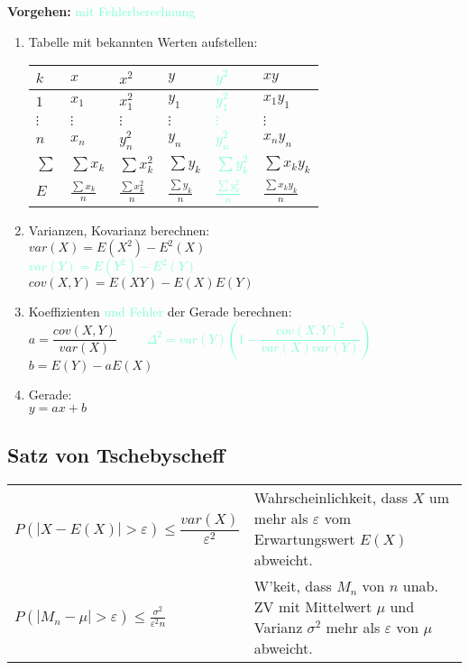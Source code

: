 \begin{minipage}[c]{10cm}
  \textbf{Vorgehen:}
  \textcolor{Aquamarine}{mit Fehlerberechnung}
	\begin{enumerate}
		\item Tabelle mit bekannten Werten aufstellen:\\
  		\begin{tabular}{|l||l|l||l|l||l|}
  		  \hline
        \textbf{$k$} & \textbf{$x$} & \textbf{$x^2$} & \textbf{$y$} &
  		  \textcolor{Aquamarine}{\textbf{$y^2$}} & \textbf{$xy$} \\
  		  \hline \hline
  		  $1$ & $x_1$ & $x_1^2$ & $y_1$ & \textcolor{Aquamarine}{$y_1^2$} & $x_1y_1$ \\
  		  \hline
  		  $\vdots$ & $\vdots$ & $\vdots$ & $\vdots$ & \textcolor{Aquamarine}{$\vdots$} &
  		  $\vdots$ \\\hline $n$ & $x_n$ & $y_n^2$ & $y_n$ & \textcolor{Aquamarine}{$y_n^2$} & $x_ny_n$ \\
  		  \hline
  		  \hline
  		  $\sum$ & $\sum x_k$ & $\sum x_k^2$ & $\sum y_k$ & \textcolor{Aquamarine}{$\sum
  		  y_k^2$} & $\sum x_ky_k$ \\
  		  \hline $E$ & $\frac{\sum x_k}{n}$ & $\frac{\sum x_k^2}{n}$ & $\frac{\sum
  		  y_k}{n}$ & \textcolor{Aquamarine}{$\frac{\sum y_k^2}{n}$} & $\frac{\sum x_ky_k}{n}$ \\
  		  \hline
  		\end{tabular} 
		\item Varianzen, Kovarianz berechnen: \\
		  $var(X) = E(X^2) - E^2(X)$ \\
		  \textcolor{Aquamarine}{$var(Y) = E(Y^2) - E^2(Y)$} \\
		  $cov(X,Y) = E(XY) - E(X)E(Y)$
		\item Koeffizienten \textcolor{Aquamarine}{und Fehler} der Gerade berechnen: \\
		  $a=\dfrac{cov(X,Y)}{var(X)}$
		  \textcolor{Aquamarine}{$\qquad\Delta^2=var(Y)\left(1-\dfrac{cov(X,Y)^2}
		  {var(X)var(Y)}\right) $} \\
		  $b=E(Y)-aE(X)$
		\item Gerade: \\
		$y=ax+b$
	\end{enumerate}
\end{minipage}
\vspace{2mm}


\subsection{Satz von Tschebyscheff }
\begin{tabular}{ll}
  $P(\left| X-E(X) \right|>\varepsilon)\leq\dfrac{var(X)}{\varepsilon^2}$ &
  Wahrscheinlichkeit, dass $X$ um mehr als $\varepsilon$ vom Erwartungswert $E(X)$ abweicht.\\
  $P(|M_{n}-\mu|>\varepsilon)\leq \frac{\sigma^{2}}{\varepsilon^{2}n} $ &
  W'keit, dass $M_{n}$ von $n$ unab. ZV mit Mittelwert $\mu$ und Varianz $\sigma^{2}$ mehr als $\varepsilon$ von $\mu$ abweicht.
\end{tabular}